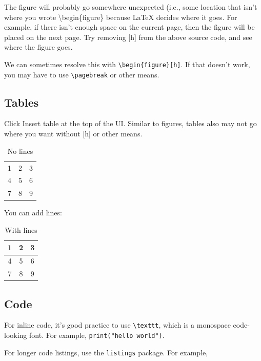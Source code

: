 \documentclass{article}
\begin{document}
The figure will probably go somewhere unexpected (i.e., some location that isn't where you wrote \textbackslash begin\{figure\} because \LaTeX{} decides where it goes. For example, if there isn't enough space on the current page, then the figure will be placed on the next page. Try removing [h] from the above source code, and see where the figure goes.

We can sometimes resolve this with \texttt{\textbackslash begin\{figure\}[h]}. If that doesn't work, you may have to use \texttt{\textbackslash pagebreak} or other means.

\subsection{Tables}

Click Insert table at the top of the UI. Similar to figures, tables also may not go where you want without [h] or other means.

\begin{table}[h]
    \centering
    \begin{tabular}{ccc}
        1 & 2 & 3\\
        4 & 5 & 6\\
        7 & 8 & 9\\
    \end{tabular}
    \caption{No lines}
\end{table}

You can add lines:

\begin{table}[h]
    \centering
    \begin{tabular}{|c|c|c|}
        \hline
        1 & 2 & 3\\
        \hline
        4 & 5 & 6\\
        \hline
        7 & 8 & 9\\
        \hline
    \end{tabular}
    \caption{With lines}
\end{table}

\subsection{Code}

For inline code, it's good practice to use \texttt{\textbackslash texttt}, which is a monospace code-looking font. For example, \texttt{print("hello world")}.

For longer code listings, use the \texttt{listings} package. For example,
\end{document}

